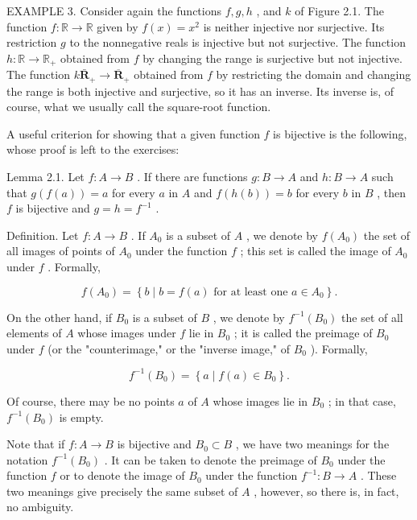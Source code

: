 \documentclass[10pt]{article}
\begin{document}
EXAMPLE 3. Consider again the functions \(f,g,h\) , and \(k\) of Figure 2.1. The function \(f : \mathbb{R} \rightarrow  \mathbb{R}\) given by \(f\left( x\right)  = {x}^{2}\) is neither injective nor surjective. Its restriction \(g\) to the nonnegative reals is injective but not surjective. The function \(h : \mathbb{R} \rightarrow  {\mathbb{R}}_{ + }\) obtained from \(f\) by changing the range is surjective but not injective. The function \(k{\bar{\mathbf{R}}}_{ + } \rightarrow  {\overline{\mathbf{R}}}_{ + }\) obtained from \(f\) by restricting the domain and changing the range is both injective and surjective, so it has an inverse. Its inverse is, of course, what we usually call the square-root function.

A useful criterion for showing that a given function \(f\) is bijective is the following, whose proof is left to the exercises:

Lemma 2.1. Let \(f : A \rightarrow  B\) . If there are functions \(g : B \rightarrow  A\) and \(h : B \rightarrow  A\) such that \(g\left( {f\left( a\right) }\right)  = a\) for every \(a\) in \(A\) and \(f\left( {h\left( b\right) }\right)  = b\) for every \(b\) in \(B\) , then \(f\) is bijective and \(g = h = {f}^{-1}\) .

Definition. Let \(f : A \rightarrow  B\) . If \({A}_{0}\) is a subset of \(A\) , we denote by \(f\left( {A}_{0}\right)\) the set of all images of points of \({A}_{0}\) under the function \(f\) ; this set is called the image of \({A}_{0}\) under \(f\) . Formally,

\[
f\left( {A}_{0}\right)  = \left\{  {b \mid  b = f\left( a\right) \text{ for at least one }a \in  {A}_{0}}\right\}  .
\]

On the other hand, if \({B}_{0}\) is a subset of \(B\) , we denote by \({f}^{-1}\left( {B}_{0}\right)\) the set of all elements of \(A\) whose images under \(f\) lie in \({B}_{0}\) ; it is called the preimage of \({B}_{0}\) under \(f\) (or the "counterimage," or the "inverse image," of \({B}_{0}\) ). Formally,

\[
{f}^{-1}\left( {B}_{0}\right)  = \left\{  {a \mid  f\left( a\right)  \in  {B}_{0}}\right\}  .
\]

Of course, there may be no points \(a\) of \(A\) whose images lie in \({B}_{0}\) ; in that case, \({f}^{-1}\left( {B}_{0}\right)\) is empty.

Note that if \(f : A \rightarrow  B\) is bijective and \({B}_{0} \subset  B\) , we have two meanings for the notation \({f}^{-1}\left( {B}_{0}\right)\) . It can be taken to denote the preimage of \({B}_{0}\) under the function \(f\) or to denote the image of \({B}_{0}\) under the function \({f}^{-1} : B \rightarrow  A\) . These two meanings give precisely the same subset of \(A\) , however, so there is, in fact, no ambiguity.
\end{document}
